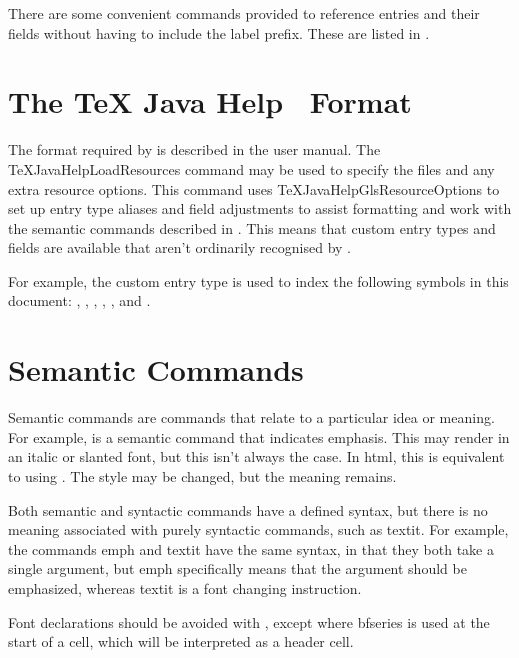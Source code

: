\documentclass[toc=listof]{scrreport}
\newcommand{\TeXJavaHelp}{\texorpdfstring{\TeX{}}{TeX} Java Help}
\begin{document}
There are some convenient commands provided to reference entries and
their fields without having to include the label prefix.
These are listed in .

\section{The \TeXJavaHelp\  Format}
\label{sec:bibformat}

The  format required by  is described in the
 user manual. The \gls{TeXJavaHelpLoadResources}
command may be used to specify the  files and any extra
resource options. This command uses
\gls{TeXJavaHelpGlsResourceOptions} to set up entry type aliases and
field adjustments to assist formatting and work with the semantic
commands described in .  This means
that custom entry types and fields are available that aren't
ordinarily recognised by .

For example, the custom  entry type is used to index
the following symbols in this document:
, , , ,
, and .


\section{Semantic Commands}
\label{sec:semanticcmds}

Semantic commands are commands that relate to a particular idea or meaning.
For example,  is a semantic command that indicates
emphasis. This may render  in an italic or slanted font, but this isn't always the
case. In \gls{html}, this is equivalent to using
.
The style may be changed, but the meaning remains.

Both semantic and syntactic commands have a defined syntax, but
there is no meaning associated with purely syntactic commands, such
as \gls{textit}. For example, the commands \gls{emph} and
\gls{textit} have the same syntax, in that they both take a single
argument, but \gls{emph} specifically means that the argument should
be emphasized, whereas \gls{textit} is a font changing instruction.

Font declarations should be avoided with , except where \gls{bfseries} is
used at the start of a  cell, which will be interpreted
as a header cell.
\end{document}
